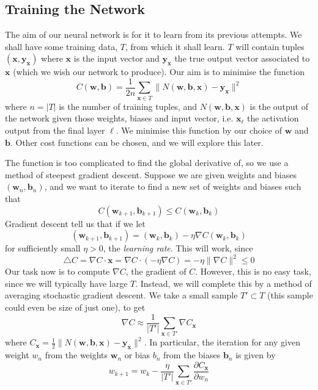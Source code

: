 \documentclass[10pt]{article}
\begin{document}
\subsection{Training the Network}
The aim of our neural network is for it to learn from its previous attempts. We shall have some training data, $T$, from which it shall learn. $T$ will contain tuples $(\mathbf{x},\mathbf{y_x})$ where $\mathbf{x}$ is the input vector and $\mathbf{y_x}$ the true output vector associated to $\mathbf{x}$ (which we wish our network to produce). Our aim is to minimise the function
\[
C(\mathbf{w},\mathbf{b})= \frac{1}{2n} \sum_{\mathbf{x} \in T}\lVert N(\mathbf{w},\mathbf{b},\mathbf{x}) - \mathbf{y_x}\rVert ^2
\]
where $n=|T|$ is the number of training tuples, and $N(\mathbf{w},\mathbf{b},\mathbf{x})$ is the output of the network given those weights, biases and input vector, i.e. $\mathbf{x}_{\ell}$ the activation output from the final layer $\ell$. We minimise this function by our choice of $\mathbf{w}$ and $\mathbf{b}$. Other cost functions can be chosen, and we will explore this later.\par
The function is too complicated to find the global derivative of, so we use a method of steepest gradient descent. Suppose we are given weights and biases $(\mathbf{w}_n, \mathbf{b}_n)$, and we want to iterate to find a new set of weights and biases such that
\[

C(\mathbf{w}_{k+1}, \mathbf{b}_{k+1}) \leq C(\mathbf{w}_k, \mathbf{b}_k)
\]
Gradient descent tell us that if we let
\[
(\mathbf{w}_{k+1}, \mathbf{b}_{k+1}) = (\mathbf{w}_k, \mathbf{b}_k) - \eta \nabla C (\mathbf{w}_{k}, \mathbf{b}_{k})

\]
for sufficiently small $\eta>0$, the \textit{learning rate}. This will work, since
\[
\triangle C = \nabla C \cdot \mathbf{x} = \nabla C \cdot \left( - \eta \nabla C  \right) = - \eta \lVert \nabla C \rVert ^2  \leq 0 
\]
Our task now is to compute $\nabla C$, the gradient of $C$. However, this is no easy task, since we will typically have large $T$. Instead, we will complete this by a method of averaging stochastic gradient descent. We take a small sample $T' \subset T$ (this sample could even be size of just one), to get
\[
\nabla C \approx \frac{1}{|T'|} \sum_{\mathbf{x} \in T'} \nabla C_\mathbf{x}
\]
where $C_\mathbf{x} = \frac{1}{2}\lVert N(\mathbf{w},\mathbf{b},\mathbf{x}) - \mathbf{y_x}\rVert ^2$. In particular, the iteration for any given weight $w_n$ from the weights $\mathbf{w}_n$ or bias $b_n$ from the biases $\mathbf{b}_n$ is given by
\[

w_{k+1} = w_k - \frac{\eta}{|T'|} \sum_{\mathbf{x} \in T'} \frac{\partial C_{\mathbf{x}}}{\partial w_n}
\]
\end{document}
